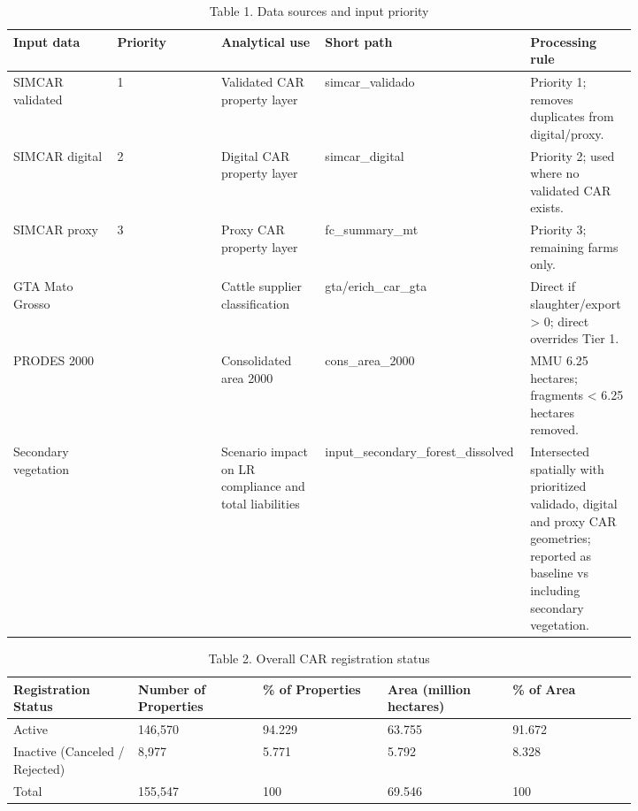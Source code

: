 \documentclass[12pt]{article}
\begin{document}
\begin{table}[H]
\centering
\caption{Table 1. Data sources and input priority}
{\fontsize{12}{14}\selectfont
\setlength{\tabcolsep}{3pt}
\renewcommand{\arraystretch}{1.08}
\begin{tabular}{p{0.164\linewidth}p{0.164\linewidth}p{0.164\linewidth}p{0.164\linewidth}p{0.164\linewidth}}
\toprule
Input data & Priority & Analytical use & Short path & Processing rule \\
\midrule
SIMCAR validated & 1 & Validated CAR property layer & simcar\_\allowbreak{}validado & Priority 1; removes duplicates from digital/proxy. \\
SIMCAR digital & 2 & Digital CAR property layer & simcar\_\allowbreak{}digital & Priority 2; used where no validated CAR exists. \\
SIMCAR proxy & 3 & Proxy CAR property layer & fc\_\allowbreak{}summary\_\allowbreak{}mt & Priority 3; remaining farms only. \\
GTA Mato Grosso &  & Cattle supplier classification & gta/erich\_\allowbreak{}car\_\allowbreak{}gta & Direct if slaughter/export > 0; direct overrides Tier 1. \\
PRODES 2000 &  & Consolidated area 2000 & cons\_\allowbreak{}area\_\allowbreak{}2000 & MMU 6.25 hectares; fragments < 6.25 hectares removed. \\
Secondary vegetation &  & Scenario impact on LR compliance and total liabilities & input\_\allowbreak{}secondary\_\allowbreak{}forest\_\allowbreak{}dissolved & Intersected spatially with prioritized validado, digital and proxy CAR geometries; reported as baseline vs including secondary vegetation. \\
\bottomrule
\end{tabular}
}
\end{table}

\begin{table}[H]
\centering
\caption{Table 2. Overall CAR registration status}
{\fontsize{12}{14}\selectfont
\setlength{\tabcolsep}{3pt}
\renewcommand{\arraystretch}{1.08}
\begin{tabular}{p{0.164\linewidth}p{0.164\linewidth}p{0.164\linewidth}p{0.164\linewidth}p{0.164\linewidth}}
\toprule
Registration Status & Number of Properties & \% of Properties & Area (million hectares) & \% of Area \\
\midrule
Active & 146,570 & 94.229 & 63.755 & 91.672 \\
Inactive (Canceled / Rejected) & 8,977 & 5.771 & 5.792 & 8.328 \\
Total & 155,547 & 100 & 69.546 & 100 \\
\bottomrule
\end{tabular}
}
\end{table}
\end{document}
